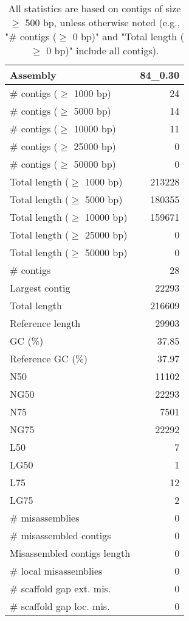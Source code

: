 \documentclass[12pt,a4paper]{article}
\begin{document}
\begin{table}[ht]
\begin{center}
\caption{All statistics are based on contigs of size $\geq$ 500 bp, unless otherwise noted (e.g., "\# contigs ($\geq$ 0 bp)" and "Total length ($\geq$ 0 bp)" include all contigs).}
\begin{tabular}{|l*{1}{|r}|}
\hline
Assembly & 84\_0.30 \\ \hline
\# contigs ($\geq$ 1000 bp) & 24 \\ \hline
\# contigs ($\geq$ 5000 bp) & 14 \\ \hline
\# contigs ($\geq$ 10000 bp) & 11 \\ \hline
\# contigs ($\geq$ 25000 bp) & 0 \\ \hline
\# contigs ($\geq$ 50000 bp) & 0 \\ \hline
Total length ($\geq$ 1000 bp) & 213228 \\ \hline
Total length ($\geq$ 5000 bp) & 180355 \\ \hline
Total length ($\geq$ 10000 bp) & 159671 \\ \hline
Total length ($\geq$ 25000 bp) & 0 \\ \hline
Total length ($\geq$ 50000 bp) & 0 \\ \hline
\# contigs & 28 \\ \hline
Largest contig & 22293 \\ \hline
Total length & 216609 \\ \hline
Reference length & 29903 \\ \hline
GC (\%) & 37.85 \\ \hline
Reference GC (\%) & 37.97 \\ \hline
N50 & 11102 \\ \hline
NG50 & 22293 \\ \hline
N75 & 7501 \\ \hline
NG75 & 22292 \\ \hline
L50 & 7 \\ \hline
LG50 & 1 \\ \hline
L75 & 12 \\ \hline
LG75 & 2 \\ \hline
\# misassemblies & 0 \\ \hline
\# misassembled contigs & 0 \\ \hline
Misassembled contigs length & 0 \\ \hline
\# local misassemblies & 0 \\ \hline
\# scaffold gap ext. mis. & 0 \\ \hline
\# scaffold gap loc. mis. & 0 \\ \hline

\end{tabular}
\end{center}
\end{table}
\end{document}
